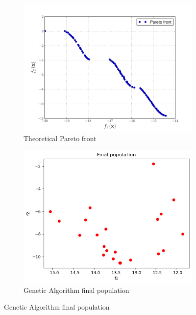 \begin{figure}[H]
    \begin{subfigure}{0.5\textwidth}
        \includegraphics[width=\textwidth]{lab8/imgs/kursawe_theory.png}
        \caption{Theoretical Pareto front}
    \end{subfigure}
    \begin{subfigure}{0.5\textwidth}
        \includegraphics[width=\textwidth]{lab8/imgs/kursawe_ga.png}
        \caption{Genetic Algorithm final population}
    \end{subfigure}
\end{figure}

